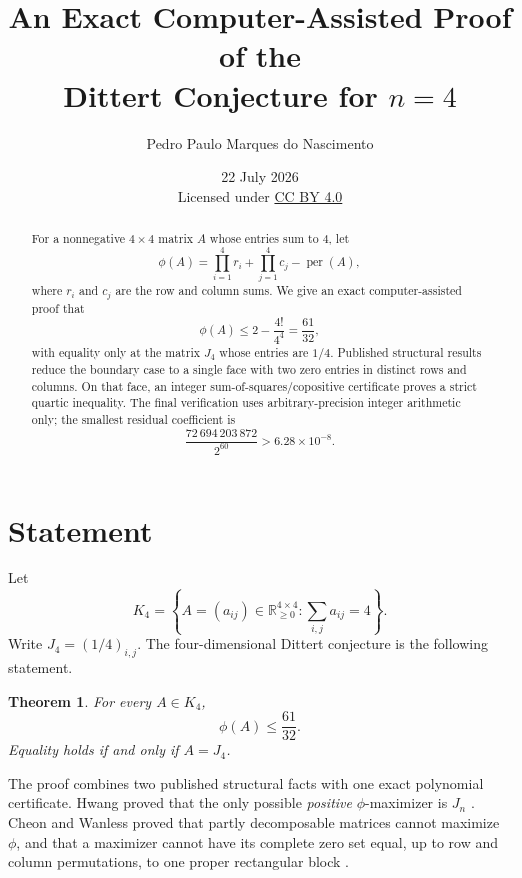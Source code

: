 \documentclass[11pt]{article}
\title{An Exact Computer-Assisted Proof of the\\Dittert Conjecture for $n=4$}
\author{Pedro Paulo Marques do Nascimento}
\date{22 July 2026\\[0.4em]
\small Licensed under \href{https://creativecommons.org/licenses/by/4.0/}{CC BY 4.0}}
\newtheorem{theorem}{Theorem}
\newcommand{\permanent}{\operatorname{per}}
\newcommand{\R}{\mathbb{R}}
\begin{document}
\maketitle

\begin{center}
\end{center}

\begin{abstract}
For a nonnegative $4\times4$ matrix $A$ whose entries sum to $4$, let
\[
 \phi(A)=\prod_{i=1}^{4}r_i+\prod_{j=1}^{4}c_j-\permanent(A),
\]
where $r_i$ and $c_j$ are the row and column sums. We give an exact computer-assisted proof that
\[
 \phi(A)\le 2-\frac{4!}{4^4}=\frac{61}{32},
\]
with equality only at the matrix $J_4$ whose entries are $1/4$. Published structural results reduce the boundary case to a single face with two zero entries in distinct rows and columns. On that face, an integer sum-of-squares/copositive certificate proves a strict quartic inequality. The final verification uses arbitrary-precision integer arithmetic only; the smallest residual coefficient is
\[
 \frac{72\,694\,203\,872}{2^{60}}>6.28\times10^{-8}.
\]
\end{abstract}

\section{Statement}
Let
\[
 K_4=\left\{A=(a_{ij})\in\R_{\ge0}^{4\times4}:\sum_{i,j}a_{ij}=4\right\}.
\]
Write $J_4=(1/4)_{i,j}$. The four-dimensional Dittert conjecture is the following statement.

\begin{theorem}\label{thm:main}
For every $A\in K_4$,
\[
 \phi(A)\le\frac{61}{32}.
\]
Equality holds if and only if $A=J_4$.
\end{theorem}

The proof combines two published structural facts with one exact polynomial certificate. Hwang proved that the only possible \emph{positive} $\phi$-maximizer is $J_n$ \cite{Hwang1986}. Cheon and Wanless proved that partly decomposable matrices cannot maximize $\phi$, and that a maximizer cannot have its complete zero set equal, up to row and column permutations, to one proper rectangular block \cite[Theorems~3.2 and~3.7]{CheonWanless2012}.
\end{document}
